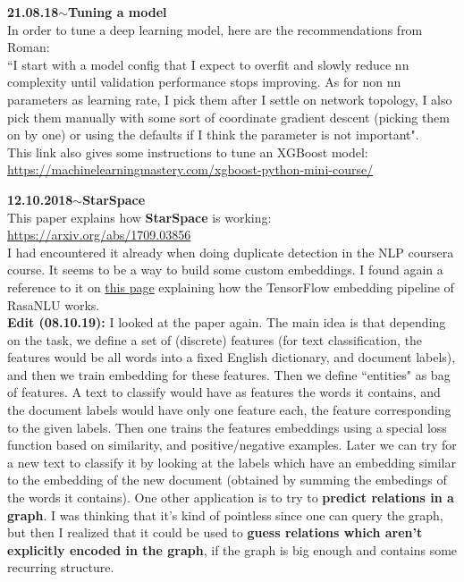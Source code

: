 \documentclass[11pt,a4paper]{article}
\newenvironment{loggentry}[2]%
{\noindent\textbf{#1}\hspace{1cm}$\mathbf{\sim}$\text{ }\textbf{#2}\\}{\vspace{0.5cm}}
\begin{document}
\begin{loggentry}{21.08.18}{Tuning a model}
In order to tune a deep learning model, here are the recommendations from Roman:\\
``I start with a model config that I expect to overfit and slowly reduce nn complexity until validation performance stops improving. As for non nn parameters as learning rate, I pick them after I settle on network topology, I also pick them manually with some sort of coordinate gradient descent (picking them on by one) or using the defaults if I think the parameter is not important".\\

This link also gives some instructions to tune an XGBoost model:\\
\url{https://machinelearningmastery.com/xgboost-python-mini-course/}\\

\end{loggentry}

\begin{loggentry}{12.10.2018}{StarSpace}

This paper explains how \textbf{StarSpace} is working:\\
\url{https://arxiv.org/abs/1709.03856}\\
I had encountered it already when doing duplicate detection in the NLP coursera course. It seems to be a way to build some custom embeddings. I found again a reference to it on \href{https://medium.com/rasa-blog/supervised-word-vectors-from-scratch-in-rasa-nlu-6daf794efcd8}{this page} explaining how the TensorFlow embedding pipeline of RasaNLU works.\\
\textbf{Edit (08.10.19):} I looked at the paper again. The main idea is that depending on the task, we define a set of (discrete) features (for text classification, the features would be all words into a fixed English dictionary, and document labels), and then we train embedding for these features. Then we define ``entities" as bag of features. A text to classify would have as features the words it contains, and the document labels would have only one feature each, the feature corresponding to the given labels. Then one trains the features embeddings using a special loss function based on similarity, and positive/negative examples. Later we can try for a new text to classify it by looking at the labels which have an embedding similar to the embedding of the new document (obtained by summing the embedings of the words it contains). One other application is to try to \textbf{predict relations in a graph}. I was thinking that it's kind of pointless since one can query the graph, but then I realized that it could be used to \textbf{guess relations which aren't explicitly encoded in the graph}, if the graph is big enough and contains some recurring structure.

\end{loggentry}
\end{document}
